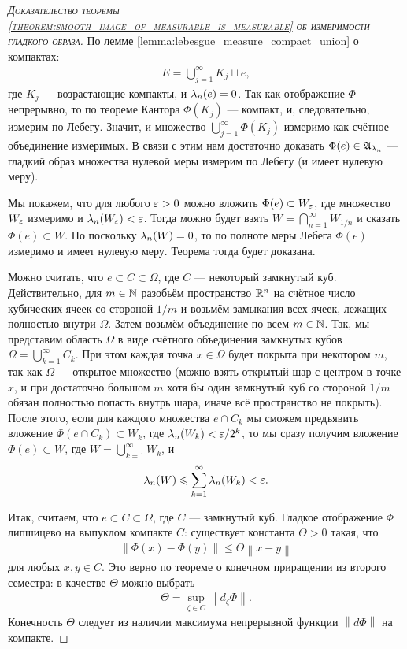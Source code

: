 \begin{proof}[\normalfont\textsc{Доказательство теоремы \ref{theorem:smooth_image_of_measurable_is_measurable} об измеримости гладкого образа}]
 По лемме \ref{lemma:lebesgue_measure_compact_union} о компактах: \begin{align*}
  E = \bigcup_{j=1}^{\infty} K_j \sqcup e
 ,\end{align*} где $K_j$ --- возрастающие компакты, и $\lambda_n(e) = 0$. Так как отображение $\Phi$ непрерывно, то по теореме Кантора $\Phi(K_j)$ --- компакт, и, следовательно, измерим по Лебегу. Значит, и множество  $\bigcup_{j=1}^{\infty} \Phi(K_j)$ измеримо как счётное объединение измеримых. В связи с этим нам достаточно доказать $\Phi(e) \in \mathfrak{A}_{\lambda_n}$ --- гладкий образ множества нулевой меры измерим по Лебегу (и имеет нулевую меру).

 Мы покажем, что для любого $\varepsilon > 0$ можно вложить $\Phi(e) \subset W_{\varepsilon}$, где множество $W_{\varepsilon}$ измеримо и $\lambda_n(W_{\varepsilon}) < \varepsilon$. Тогда можно будет взять $W = \bigcap_{n=1}^{\infty} W_{1 / n}$ и сказать $\Phi(e) \subset W$. Но поскольку $\lambda_n(W) = 0$, то по полноте меры Лебега $\Phi(e)$ измеримо и имеет нулевую меру. Теорема тогда будет доказана.

 Можно считать, что $e \subset C \subset \Omega$,  где $C$  --- некоторый замкнутый куб. Действительно, для $m \in \mathbb{N}$  разобьём пространство $\mathbb{R}^{n}$  на счётное число кубических ячеек со стороной $1 / m$ и возьмём замыкания всех ячеек, лежащих полностью внутри $\Omega$.  Затем возьмём объединение по всем $m \in \mathbb{N}$.  Так, мы представим область $\Omega$ в виде счётного объединения замкнутых кубов $\Omega = \bigcup_{k=1}^{\infty} C_k $. При этом каждая точка  $x \in \Omega$ будет покрыта при некотором  $m$, так как $\Omega$  --- открытое множество (можно взять открытый шар с центром в точке $x$, и при достаточно большом $m$ хотя бы один замкнутый куб со стороной $1 / m$ обязан полностью попасть внутрь шара, иначе всё пространство не покрыть). После этого, если для каждого множества $e \cap C_k$ мы сможем предъявить вложение  $\Phi(e \cap C_k) \subset W_k$, где $\lambda_n(W_k) < \varepsilon / 2^{k}$, то мы сразу получим вложение $\Phi(e) \subset W$, где $W = \bigcup_{k=1}^{\infty} W_k$, и
 \begin{align*}
  \lambda_n(W) \leqslant \sum_{k=1}^{\infty} \lambda_n(W_k) < \varepsilon
 .\end{align*} 

 Итак, считаем, что $e \subset C \subset \Omega$, где $C$ --- замкнутый куб. Гладкое отображение $\Phi$ липшицево на выпуклом компакте $C$: существует константа $\Theta > 0$ такая, что
 \begin{align*}
  \left\| \Phi(x) - \Phi(y) \right\| \leqslant \Theta \left\| x - y \right\|
 \end{align*} для любых $x, y \in C$. Это верно по теореме о конечном приращении из второго семестра: в качестве $\Theta$ можно выбрать
 \begin{align*}
  \Theta = \sup_{\zeta \in C} \left\| d_{\zeta} \Phi \right\|
 .\end{align*} Конечность $\Theta$ следует из наличии максимума непрерывной функции  $\left\| d \Phi \right\|$  на компакте.


\end{proof}

